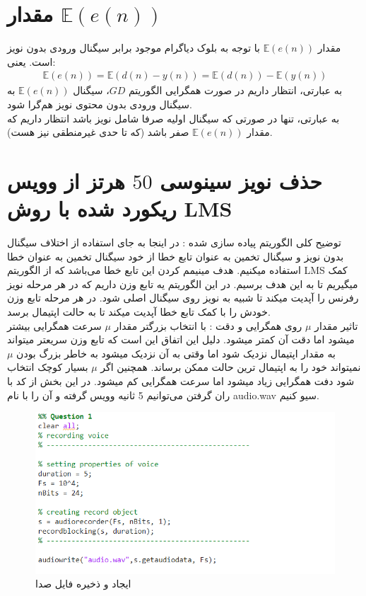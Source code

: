\documentclass[fleqn]{article}
\theoremstyle{definition}
\begin{document}
\section{مقدار $\mathbb{E}(e(n))$}
    مقدار $\mathbb{E}(e(n))$ با توجه به بلوک دیاگرام موجود برابر سیگنال ورودی بدون نویز است. یعنی:
    \begin{gather*}
        \mathbb{E}(e(n)) = \mathbb{E}(d(n) - y(n)) = \mathbb{E}(d(n)) - \mathbb{E}(y(n))
    \end{gather*}
    به عبارتی، انتظار داریم در صورت همگرایی الگوریتم $GD$، سیگنال $\mathbb{E}(e(n))$ به سیگنال ورودی بدون محتوی نویز هم‌گرا شود.\\
    به عبارتی، تنها در صورتی که سیگنال اولیه صرفا شامل نویز باشد انتظار داریم که مقدار $\mathbb{E}(e(n))$ صفر باشد (که تا حدی غیرمنطقی نیز هست).
    

    \section{حذف نویز سینوسی $50$ هرتز از وویس ریکورد شده با روش LMS }
    توضیح کلی الگوریتم پیاده سازی شده :
    در اینجا به جای استفاده از اختلاف سیگنال بدون نویز و سیگنال تخمین به عنوان تابع خطا از خود سیگنال تخمین به عنوان خطا استفاده میکنیم.
    هدف مینیمم کردن این تابع خطا می‌باشد که از الگوریتم LMS کمک میگیریم تا به این هدف برسیم.
    در این الگوریتم یه تابع وزن داریم که در هر مرحله نویز رفرنس را آپدیت میکند تا شبیه به نویز روی سیگنال اصلی شود.
    در هر مرحله تابع وزن خودش را با کمک تابع خطا آپدیت میکند تا به حالت اپتیمال برسد.
    \\
    تاثیر مقدار $\mu$ روی همگرایی و دقت :
    با انتخاب بزرگتر مقدار $\mu$ سرعت همگرایی بیشتر میشود اما دقت آن کمتر میشود.
    دلیل این اتفاق این است که تابع وزن سریعتر میتواند به مقدار اپتیمال نزدیک شود اما وقتی به آن نزدیک میشود به خاطر بزرگ بودن $\mu$ نمیتواند خود را به اپتیمال ترین حالت ممکن برساند.
    همچنین اگر $\mu$ بسیار کوچک انتخاب شود دفت همگرایی زیاد میشود اما سرعت همگرایی کم میشود.
    \clearpage
    در این بخش از کد با ران گرفتن می‌توانیم 5 ثانیه وویس گرفته و آن را با نام audio.wav سیو کنیم.
    \begin{figure}[h!]
        \centering
        \includegraphics[width=0.4\linewidth]{Pics/Screenshot (181).png}
        \caption{ایجاد و ذخیره فایل صدا}
        \label{fig:Saving voice}
    \end{figure}
\end{document}
